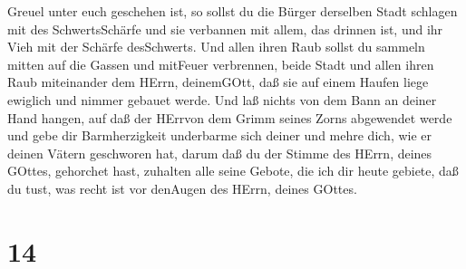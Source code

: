 Greuel unter euch geschehen ist,  so sollst du die Bürger
derselben Stadt schlagen mit des SchwertsSchärfe und sie verbannen mit
allem, das drinnen ist, und ihr Vieh mit der Schärfe desSchwerts.
 Und allen ihren Raub sollst du sammeln mitten auf die
Gassen und mitFeuer verbrennen, beide Stadt und allen ihren Raub
miteinander dem HErrn, deinemGOtt, daß sie auf einem Haufen liege
ewiglich und nimmer gebauet werde.  Und laß nichts von dem
Bann an deiner Hand hangen, auf daß der HErrvon dem Grimm seines Zorns
abgewendet werde und gebe dir Barmherzigkeit underbarme sich deiner und
mehre dich, wie er deinen Vätern geschworen hat,  darum daß
du der Stimme des HErrn, deines GOttes, gehorchet hast, zuhalten alle
seine Gebote, die ich dir heute gebiete, daß du tust, was recht ist vor
denAugen des HErrn, deines GOttes.

\hypertarget{section-13}{%
\section{14}\label{section-13}}

